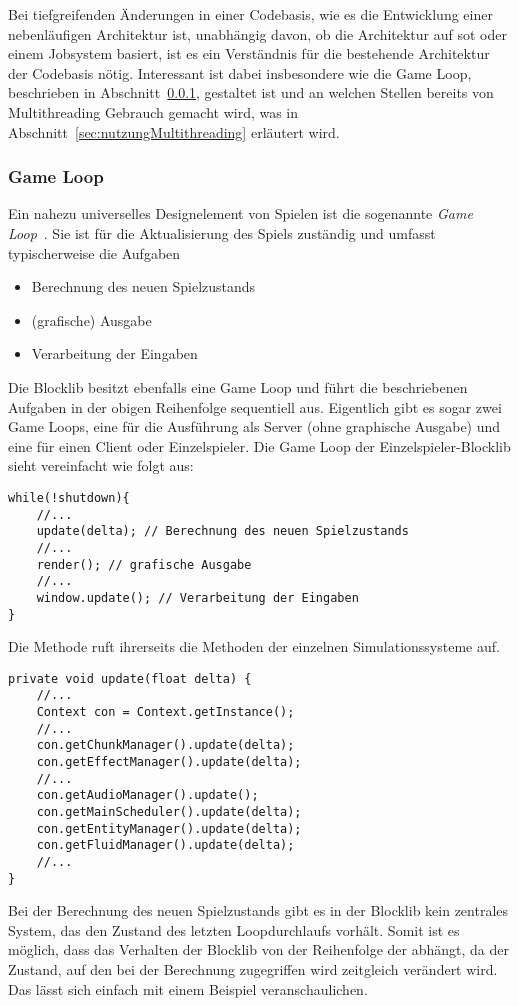 Bei tiefgreifenden Änderungen in einer Codebasis, wie es die Entwicklung einer nebenläufigen Architektur ist, unabhängig davon, ob die Architektur auf \ac{sot} oder einem Jobsystem basiert, ist es ein Verständnis für die bestehende Architektur der Codebasis nötig. Interessant ist dabei insbesondere wie die Game Loop, beschrieben in Abschnitt~\ref{sec:gameLoop}, gestaltet ist und an welchen Stellen bereits von Multithreading Gebrauch gemacht wird, was in Abschnitt~\ref{sec:nutzungMultithreading} erläutert wird.

\subsubsection{Game Loop}\label{sec:gameLoop}
Ein nahezu universelles Designelement von Spielen ist die sogenannte \emph{Game Loop}~\cite[S.~161~ff.]{Nystrom2015}. Sie ist für die Aktualisierung des Spiels zuständig und umfasst typischerweise die Aufgaben 
\begin{itemize}
  \item Berechnung des neuen Spielzustands
  \item (grafische) Ausgabe
  \item Verarbeitung der Eingaben
\end{itemize}
Die Blocklib besitzt ebenfalls eine Game Loop und führt die beschriebenen Aufgaben in der obigen Reihenfolge sequentiell aus. Eigentlich gibt es sogar zwei Game Loops, eine für die Ausführung als Server (ohne graphische Ausgabe) und eine für einen Client oder Einzelspieler. Die Game Loop der Einzelspieler-Blocklib sieht vereinfacht wie folgt aus:
\begin{lstlisting}
while(!shutdown){
	//...
	update(delta); // Berechnung des neuen Spielzustands
	//...
	render(); // grafische Ausgabe
	//...
	window.update(); // Verarbeitung der Eingaben
}
\end{lstlisting}

Die Methode  ruft ihrerseits die  Methoden der einzelnen Simulationssysteme auf.
\begin{lstlisting}
private void update(float delta) {
	//...
	Context con = Context.getInstance();
	//...
	con.getChunkManager().update(delta);
	con.getEffectManager().update(delta);
	//...
	con.getAudioManager().update();
	con.getMainScheduler().update(delta);
	con.getEntityManager().update(delta);
	con.getFluidManager().update(delta);
	//...
}
\end{lstlisting}
Bei der Berechnung des neuen Spielzustands gibt es in der Blocklib kein zentrales System, das den Zustand des letzten Loopdurchlaufs vorhält. Somit ist es möglich, dass das Verhalten der Blocklib von der Reihenfolge der  abhängt, da der Zustand, auf den bei der Berechnung zugegriffen wird zeitgleich verändert wird. Das lässt sich einfach mit einem Beispiel veranschaulichen. 

